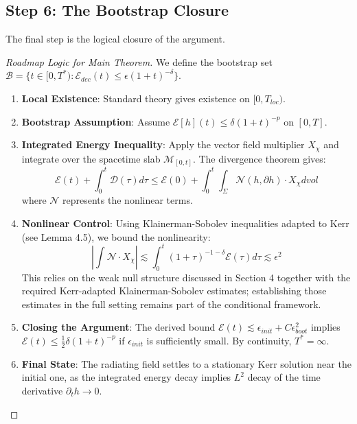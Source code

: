 \documentclass[12pt,a4paper]{article}
\begin{document}
\subsection{Step 6: The Bootstrap Closure}

The final step is the logical closure of the argument.

\begin{proof}[Roadmap Logic for Main Theorem]
We define the bootstrap set $\mathcal{B} = \{ t \in [0, T^*) : \mathcal{E}_{dec}(t) \leq \epsilon (1+t)^{-\delta} \}$.
\begin{enumerate}
    \item \textbf{Local Existence}: Standard theory gives existence on $[0, T_{loc})$.
    \item \textbf{Bootstrap Assumption}: Assume $\mathcal{E}[h](t) \leq \delta (1+t)^{-p}$ on $[0, T]$.
    \item \textbf{Integrated Energy Inequality}:
    Apply the vector field multiplier $X_\chi$ and integrate over the spacetime slab $\mathcal{M}_{[0,t]}$. The divergence theorem gives:
    \begin{equation}
    \mathcal{E}(t) + \int_0^t \mathcal{D}(\tau) d\tau \leq \mathcal{E}(0) + \int_0^t \int_\Sigma \mathcal{N}(h, \partial h) \cdot X_\chi dvol
    \end{equation}
    where $\mathcal{N}$ represents the nonlinear terms.
    
    \item \textbf{Nonlinear Control}:
    Using Klainerman-Sobolev inequalities adapted to Kerr (see Lemma 4.5), we bound the nonlinearity:
    \begin{equation}
    \left| \int \mathcal{N} \cdot X_\chi \right| \lesssim \int_0^t (1+\tau)^{-1-\delta} \mathcal{E}(\tau) d\tau \lesssim \epsilon^2
    \end{equation}
    This relies on the weak null structure discussed in Section 4 together with the required Kerr-adapted Klainerman-Sobolev estimates; establishing those estimates in the full setting remains part of the conditional framework.
    
    \item \textbf{Closing the Argument}:
    The derived bound $\mathcal{E}(t) \lesssim \epsilon_{init} + C \epsilon_{boot}^2$ implies $\mathcal{E}(t) \leq \frac{1}{2}\delta (1+t)^{-p}$ if $\epsilon_{init}$ is sufficiently small. By continuity, $T^* = \infty$.
    
    \item \textbf{Final State}: The radiating field settles to a stationary Kerr solution near the initial one, as the integrated energy decay implies $L^2$ decay of the time derivative $\partial_t h \to 0$.
\end{enumerate}
\end{proof}
\end{document}
